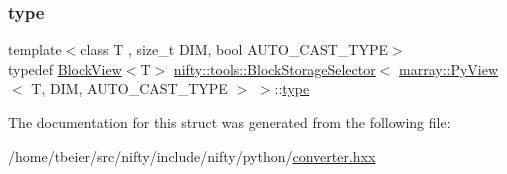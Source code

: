\subsubsection{\texorpdfstring{type}{type}}
{\footnotesize\ttfamily template$<$class T , size\+\_\+t D\+IM, bool A\+U\+T\+O\+\_\+\+C\+A\+S\+T\+\_\+\+T\+Y\+PE$>$ \\
typedef \hyperlink{classnifty_1_1tools_1_1BlockView}{Block\+View}$<$T$>$ \hyperlink{structnifty_1_1tools_1_1BlockStorageSelector}{nifty\+::tools\+::\+Block\+Storage\+Selector}$<$ \hyperlink{classnifty_1_1marray_1_1PyView}{marray\+::\+Py\+View}$<$ T, D\+IM, A\+U\+T\+O\+\_\+\+C\+A\+S\+T\+\_\+\+T\+Y\+PE $>$ $>$\+::\hyperlink{structnifty_1_1tools_1_1BlockStorageSelector_3_01marray_1_1PyView_3_01T_00_01DIM_00_01AUTO__CAST__TYPE_01_4_01_4_a54e2a2d6a165af25c382a2130e23a36d}{type}}



The documentation for this struct was generated from the following file\+:\begin{DoxyCompactItemize}
\item 
/home/tbeier/src/nifty/include/nifty/python/\hyperlink{converter_8hxx}{converter.\+hxx}\end{DoxyCompactItemize}
